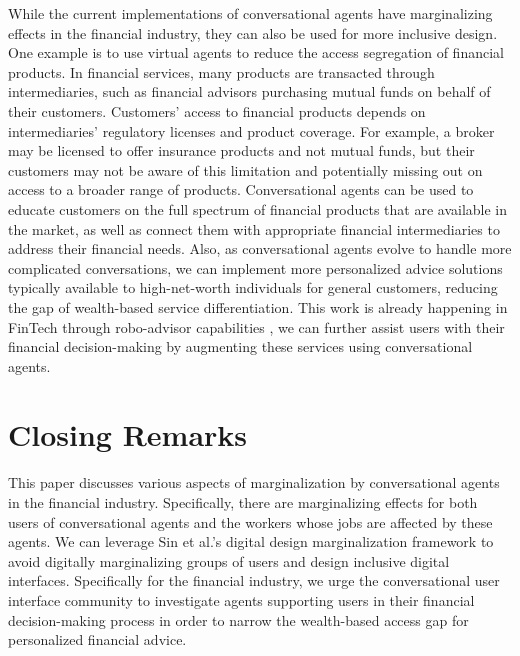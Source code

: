 \documentclass{sigchi-ext}
\begin{document}
While the current implementations of conversational agents have marginalizing effects in the financial industry, they can also be used for more inclusive design. One example is to use virtual agents to reduce the access segregation of financial products. In financial services, many products are transacted through intermediaries, such as financial advisors purchasing mutual funds on behalf of their customers. Customers' access to financial products depends on intermediaries' regulatory licenses and product coverage. For example, a broker may be licensed to offer insurance products and not mutual funds, but their customers may not be aware of this limitation and potentially missing out on access to a broader range of products. Conversational agents can be used to educate customers on the full spectrum of financial products that are available in the market, as well as connect them with appropriate financial intermediaries to address their financial needs. Also, as conversational agents evolve to handle more complicated conversations, we can implement more personalized advice solutions typically available to high-net-worth individuals for general customers, reducing the gap of wealth-based service differentiation. This work is already happening in FinTech through robo-advisor capabilities \cite{philippon2019fintech}, we can further assist users with their financial decision-making by augmenting these services using conversational agents. 


\section{Closing Remarks}

This paper discusses various aspects of marginalization by conversational agents in the financial industry. Specifically, there are marginalizing effects for both users of conversational agents and the workers whose jobs are affected by these agents. We can leverage Sin et al.\cite{sin2021digital}'s digital design marginalization framework to avoid digitally marginalizing groups of users and design inclusive digital interfaces. Specifically for the financial industry, we urge the conversational user interface community to investigate agents supporting users in their financial decision-making process in order to narrow the wealth-based access gap for personalized financial advice.

\balance{} 



\end{document}
